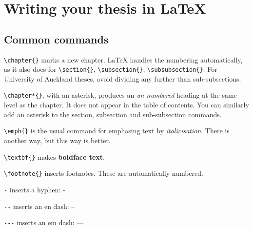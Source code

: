 \chapter{Writing your thesis in LaTeX}
%
%
\section{Common commands}
\begin{description}
\item {\verb+\chapter{}+} marks a new chapter. LaTeX handles the numbering automatically, as it also does for \verb+\section{}+, \verb+\subsection{}+, \verb+\subsubsection{}+. For University of Auckland theses, avoid dividing any further than sub-subsections.
\item {\verb+\chapter*{}+}, with an asterisk, produces an \emph{un-numbered} heading at the same level as the chapter. It does not appear in the table of contents. You can  similarly add an asterisk to the section, subsection and sub-subsection commands.
\item {\verb+\emph{}+} is the usual command for emphasing text by \emph{italicisation}. There is another way, but this way is better.
\item {\verb+\textbf{}+} makes \textbf{boldface text}.
\item {\verb+\footnote{}+} inserts footnotes. These are automatically numbered.
\item {\verb+-+} inserts a hyphen: - 
\item {\verb+--+} inserts an en dash: --
\item {\verb+---+} inserts an em dash: ---
\end{description}

